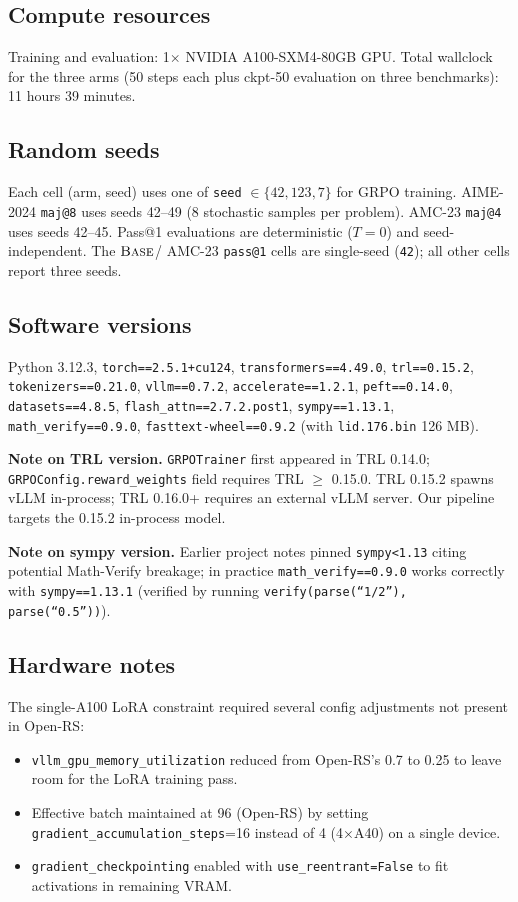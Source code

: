 \subsection{Compute resources}
Training and evaluation: 1$\times$ NVIDIA A100-SXM4-80GB GPU. Total
wallclock for the three arms (50 steps each
plus ckpt-50 evaluation on three benchmarks): 11 hours 39 minutes.

\subsection{Random seeds}
Each cell (arm, seed) uses one of \texttt{seed} $\in \{42, 123, 7\}$ for
GRPO training. AIME-2024 \texttt{maj@8} uses seeds 42--49 (8 stochastic
samples per problem). AMC-23 \texttt{maj@4} uses seeds 42--45. Pass@1
evaluations are deterministic ($T{=}0$) and seed-independent. The
$\textsc{Base}$/\armD{} AMC-23 \texttt{pass@1} cells are single-seed
(\texttt{42}); all other cells report three seeds.

\subsection{Software versions}
Python 3.12.3, \texttt{torch==2.5.1+cu124}, \texttt{transformers==4.49.0},
\texttt{trl==0.15.2}, \texttt{tokenizers==0.21.0}, \texttt{vllm==0.7.2},
\texttt{accelerate==1.2.1}, \texttt{peft==0.14.0}, \texttt{datasets==4.8.5},
\texttt{flash\_attn==2.7.2.post1}, \texttt{sympy==1.13.1},
\texttt{math\_verify==0.9.0}, \texttt{fasttext-wheel==0.9.2}
(with \texttt{lid.176.bin} 126 MB).

\textbf{Note on TRL version.} \texttt{GRPOTrainer} first appeared in TRL 0.14.0;
\texttt{GRPOConfig.reward\_weights} field requires TRL $\geq$ 0.15.0. TRL 0.15.2
spawns vLLM in-process; TRL 0.16.0+ requires an external vLLM server. Our pipeline
targets the 0.15.2 in-process model.

\textbf{Note on sympy version.} Earlier project notes pinned
\texttt{sympy<1.13} citing potential Math-Verify breakage; in practice
\texttt{math\_verify==0.9.0} works correctly with \texttt{sympy==1.13.1}
(verified by running \texttt{verify(parse(``1/2''), parse(``0.5''))}).

\subsection{Hardware notes}
The single-A100 LoRA constraint required several config adjustments not present
in Open-RS:
\begin{itemize}\itemsep0pt
\item \texttt{vllm\_gpu\_memory\_utilization} reduced from Open-RS's 0.7 to 0.25 to
leave room for the LoRA training pass.
\item Effective batch maintained at 96 (Open-RS) by setting
\texttt{gradient\_accumulation\_steps}=16 instead of 4 (4$\times$A40) on a single
device.
\item \texttt{gradient\_checkpointing} enabled with
\texttt{use\_reentrant=False} to fit activations in remaining VRAM.
\end{itemize}

